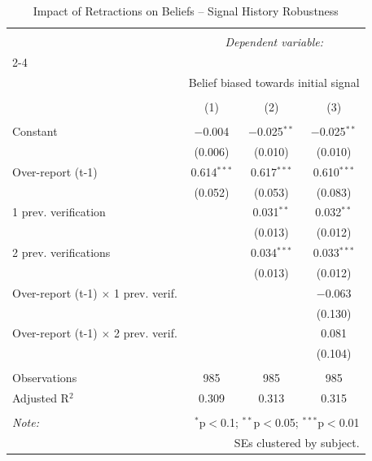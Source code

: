
\begin{table}[!htbp] \centering 
  \caption{Impact of Retractions on Beliefs -- Signal History Robustness} 
  \label{} 
\begin{tabular}{@{\extracolsep{5pt}}lccc} 
\\[-1.8ex]\hline 
\hline \\[-1.8ex] 
 & \multicolumn{3}{c}{\textit{Dependent variable:}} \\ 
\cline{2-4} 
\\[-1.8ex] & \multicolumn{3}{c}{Belief biased towards initial signal} \\ 
\\[-1.8ex] & (1) & (2) & (3)\\ 
\hline \\[-1.8ex] 
 Constant & $-$0.004 & $-$0.025$^{**}$ & $-$0.025$^{**}$ \\ 
  & (0.006) & (0.010) & (0.010) \\ 
  Over-report (t-1) & 0.614$^{***}$ & 0.617$^{***}$ & 0.610$^{***}$ \\ 
  & (0.052) & (0.053) & (0.083) \\ 
  1 prev. verification &  & 0.031$^{**}$ & 0.032$^{**}$ \\ 
  &  & (0.013) & (0.012) \\ 
  2 prev. verifications &  & 0.034$^{***}$ & 0.033$^{***}$ \\ 
  &  & (0.013) & (0.012) \\ 
  Over-report (t-1) $\times$ 1 prev. verif. &  &  & $-$0.063 \\ 
  &  &  & (0.130) \\ 
  Over-report (t-1) $\times$ 2 prev. verif. &  &  & 0.081 \\ 
  &  &  & (0.104) \\ 
 \hline \\[-1.8ex] 
Observations & 985 & 985 & 985 \\ 
Adjusted R$^{2}$ & 0.309 & 0.313 & 0.315 \\ 
\hline 
\hline \\[-1.8ex] 
\textit{Note:}  & \multicolumn{3}{r}{$^{*}$p$<$0.1; $^{**}$p$<$0.05; $^{***}$p$<$0.01} \\ 
 & \multicolumn{3}{r}{SEs clustered by subject.} \\ 
\end{tabular} 
\end{table} 
